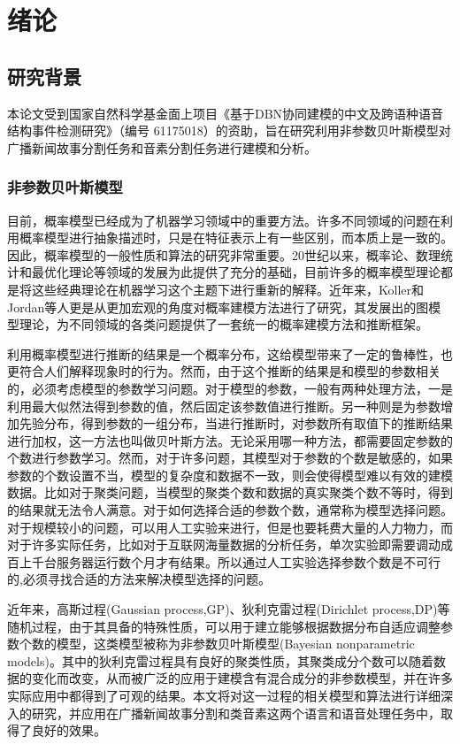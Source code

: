 \chapter{绪论}
\section{研究背景}
本论文受到国家自然科学基金面上项目《基于DBN协同建模的中文及跨语种语音结构事件检测研究》（编号 61175018）的资助，旨在研究利用非参数贝叶斯模型对广播新闻故事分割任务和音素分割任务进行建模和分析。
\subsection{非参数贝叶斯模型}
目前，概率模型已经成为了机器学习领域中的重要方法。许多不同领域的问题在利用概率模型进行抽象描述时，只是在特征表示上有一些区别，而本质上是一致的。因此，概率模型的一般性质和算法的研究非常重要。20世纪以来，概率论、数理统计和最优化理论等领域的发展为此提供了充分的基础，目前许多的概率模型理论都是将这些经典理论在机器学习这个主题下进行重新的解释。近年来，Koller和Jordan等人更是从更加宏观的角度对概率建模方法进行了研究，其发展出的图模型理论，为不同领域的各类问题提供了一套统一的概率建模方法和推断框架\cite{koller:2009,jordan:2003introduction,wainwright2008graphical}。

利用概率模型进行推断的结果是一个概率分布，这给模型带来了一定的鲁棒性，也更符合人们解释现象时的行为。然而，由于这个推断的结果是和模型的参数相关的，必须考虑模型的参数学习问题。对于模型的参数，一般有两种处理方法，一是利用最大似然法得到参数的值，然后固定该参数值进行推断。另一种则是为参数增加先验分布，得到参数的一组分布，当进行推断时，对参数所有取值下的推断结果进行加权，这一方法也叫做贝叶斯方法。无论采用哪一种方法，都需要固定参数的个数进行参数学习。然而，对于许多问题，其模型对于参数的个数是敏感的，如果参数的个数设置不当，模型的复杂度和数据不一致，则会使得模型难以有效的建模数据。比如对于聚类问题，当模型的聚类个数和数据的真实聚类个数不等时，得到的结果就无法令人满意。对于如何选择合适的参数个数，通常称为模型选择\cite{kohavi1995study,burnham2002model,hastie2009elements}问题。对于规模较小的问题，可以用人工实验来进行，但是也要耗费大量的人力物力，而对于许多实际任务，比如对于互联网海量数据的分析任务，单次实验即需要调动成百上千台服务器运行数个月才有结果。所以通过人工实验选择参数个数是不可行的,必须寻找合适的方法来解决模型选择的问题。

近年来，高斯过程(Gaussian process,GP)\cite{rasmussen2006gaussian}、狄利克雷过程(Dirichlet process,DP)\cite{TEH:06,teh2010dirichlet}等随机过程，由于其具备的特殊性质，可以用于建立能够根据数据分布自适应调整参数个数的模型，这类模型被称为非参数贝叶斯模型(Bayesian nonparametric models)\cite{gershman2012tutorial}。其中的狄利克雷过程具有良好的聚类性质，其聚类成分个数可以随着数据的变化而改变，从而被广泛的应用于建模含有混合成分的非参数模型，并在许多实际应用中都得到了可观的结果\cite{GHO:2012}。本文将对这一过程的相关模型和算法进行详细深入的研究，并应用在广播新闻故事分割和类音素这两个语言和语音处理任务中，取得了良好的效果。

